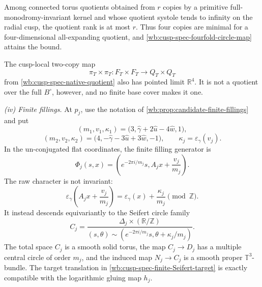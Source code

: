 \begin{theorem}
Among connected torus quotients obtained from \(r\) copies by a primitive
full-monodromy-invariant kernel and whose quotient systole tends to infinity
on the radial cusp, the quotient rank is at most \(r\).  Thus four copies
are minimal for a four-dimensional all-expanding quotient, and
\cref{wb:cusp-spec-fourfold-circle-map} attains the bound.

The cusp-local two-copy map
\begin{equation}
 \pi_T\times\pi_T:F_T\times F_T\longrightarrow Q_T\times Q_T
 \label{wb:cusp-spec-doubled-local-quotient}
\end{equation}
from \cref{wb:cusp-spec-native-quotient} also has pointed limit
\(\mathbb R^4\).  It is not a quotient over the full \(B^\circ\), however,
and no finite base cover makes it one.

\smallskip
\noindent
\emph{(iv) Finite fillings.}
At \(p_j\), use the notation of
\cref{wb:prop:candidate-finite-fillings} and put
\[
 (m_1,v_1,\kappa_1)
 =\bigl(3,\widehat\gamma+2\widehat u-4\widehat w,1\bigr),
\]
\[
 (m_2,v_2,\kappa_2)
 =\bigl(4,-\widehat\gamma-3\widehat u+3\widehat w,-1\bigr),\qquad
 \kappa_j=\varepsilon_\gamma(v_j).
\tag{G.2}
\]
In the un-conjugated flat coordinates, the finite filling generator is
\begin{equation}
 \Phi_j(s,x)=
 \left(e^{-2\pi i/m_j}s,A_jx+\frac{v_j}{m_j}\right).
 \label{wb:cusp-spec-finite-affine-action}
\end{equation}
The raw character is not invariant:
\begin{equation}
 \varepsilon_\gamma\left(A_jx+\frac{v_j}{m_j}\right)
 =\varepsilon_\gamma(x)+\frac{\kappa_j}{m_j}\pmod{\mathbb Z}.
 \label{wb:cusp-spec-finite-character-shift}
\end{equation}
It instead descends equivariantly to the Seifert circle family
\begin{equation}
 C_j=
 \frac{\Delta_j\times(\mathbb R/\mathbb Z)}
 {(s,\theta)\sim
  (e^{-2\pi i/m_j}s,\theta+\kappa_j/m_j)}.
 \label{wb:cusp-spec-finite-Seifert-target}
\end{equation}
The total space \(C_j\) is a smooth solid torus, the map
\(C_j\to D_j\) has a multiple central circle of order \(m_j\), and the
induced map \(N_j\to C_j\) is a smooth proper \(\mathbb T^3\)-bundle.
The target translation in \cref{wb:cusp-spec-finite-Seifert-target} is
exactly compatible with the logarithmic gluing map \(h_j\).


\end{theorem}
